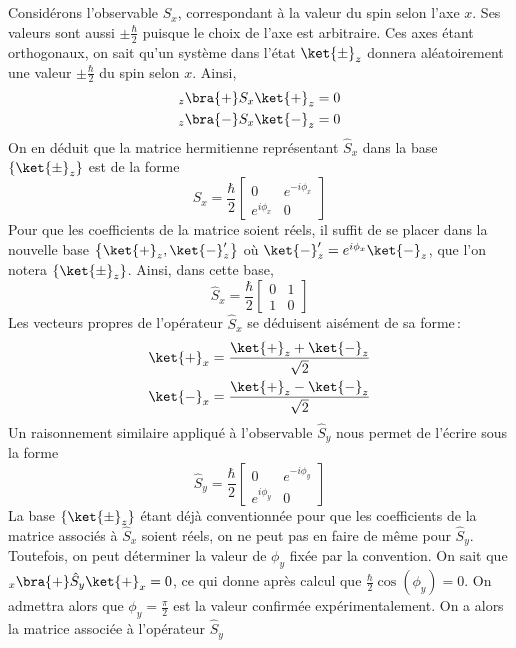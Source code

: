         Considérons l’observable $\hat{S}_x$, correspondant à la valeur du spin selon l’axe $x$. Ses valeurs sont aussi $\pm \frac{\hbar}{2}$ puisque le choix de l’axe est arbitraire. Ces axes étant orthogonaux, on sait qu’un système dans l’état $\ket{\pm}_z$ donnera aléatoirement une valeur $\pm \frac{\hbar}{2}$ du spin selon $x$. Ainsi, 
        \begin{align*}
            _z\bra{+} S_x \ket{+}_z &= 0 \\
            _z\bra{-} S_x \ket{-}_z &= 0
        \end{align*}
        On en déduit que la matrice hermitienne représentant $\hat{S}_x$ dans la base $\left\{\ket{\pm}_z\right\}$ est de la forme
        \[ \hat{S}_x = \frac{\hbar}{2} \begin{bmatrix}
            0 & e^{-i\phi_x} \\
            e^{i\phi_x} & 0
        \end{bmatrix} \]
        Pour que les coefficients de la matrice soient réels, il suffit de se placer dans la nouvelle base $\left\{\ket{+}_z, \ket{-}'_z\right\}$ où $\ket{-}'_z = e^{i \phi_x} \ket{-}_z$, que l’on notera $\left\{\ket{\pm}_z\right\}$. Ainsi, dans cette base, 
        \[ \hat{S}_x = \frac{\hbar}{2} \begin{bmatrix}
            0 & 1 \\
            1 & 0
        \end{bmatrix} \]
        Les vecteurs propres de l’opérateur $\hat{S}_x$ se déduisent aisément de sa forme :
        \begin{align*}
            \ket{+}_x &= \frac{\ket{+}_z + \ket{-}_z}{\sqrt{2}} \\
            \ket{-}_x &= \frac{\ket{+}_z - \ket{-}_z}{\sqrt{2}} \\
        \end{align*}
        Un raisonnement similaire appliqué à l’observable $\hat{S}_y$ nous permet de l’écrire sous la forme 
        \[ \hat{S}_y = \frac{\hbar}{2} \begin{bmatrix}
            0 & e^{-i\phi_y} \\
            e^{i\phi_y} & 0
        \end{bmatrix} \]
        La base $\left\{\ket{\pm}_z\right\}$ étant déjà conventionnée pour que les coefficients de la matrice associés à $\hat{S}_x$ soient réels, on ne peut pas en faire de même pour $\hat{S}_y$. Toutefois, on peut déterminer la valeur de $\phi_y$ fixée par la convention. On sait que $_x\bra{+} \hat{S}_y \ket{+}_x = 0$, ce qui donne après calcul que $\frac{\hbar}{2} \cos(\phi_y) = 0$. On admettra alors que $\phi_y = \frac{\pi}{2}$ est la valeur confirmée expérimentalement. On a alors la matrice associée à l’opérateur $\hat{S}_y$
